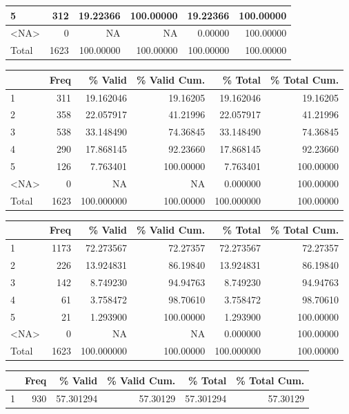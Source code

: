 \documentclass[
  letterpaper,
  DIV=11,
  numbers=noendperiod]{scrartcl}
\begin{document}
\begin{table}
\begin{tabular}[t]{l|r|r|r|r|r}
\hline
5 & 312 & 19.22366 & 100.00000 & 19.22366 & 100.00000\\
\hline
<NA> & 0 & NA & NA & 0.00000 & 100.00000\\
\hline
Total & 1623 & 100.00000 & 100.00000 & 100.00000 & 100.00000\\
\hline
\end{tabular}
\centering
\begin{tabular}[t]{l|r|r|r|r|r}
\hline
  & Freq & \% Valid & \% Valid Cum. & \% Total & \% Total Cum.\\
\hline
1 & 311 & 19.162046 & 19.16205 & 19.162046 & 19.16205\\
\hline
2 & 358 & 22.057917 & 41.21996 & 22.057917 & 41.21996\\
\hline
3 & 538 & 33.148490 & 74.36845 & 33.148490 & 74.36845\\
\hline
4 & 290 & 17.868145 & 92.23660 & 17.868145 & 92.23660\\
\hline
5 & 126 & 7.763401 & 100.00000 & 7.763401 & 100.00000\\
\hline
<NA> & 0 & NA & NA & 0.000000 & 100.00000\\
\hline
Total & 1623 & 100.000000 & 100.00000 & 100.000000 & 100.00000\\
\hline
\end{tabular}
\centering
\begin{tabular}[t]{l|r|r|r|r|r}
\hline
  & Freq & \% Valid & \% Valid Cum. & \% Total & \% Total Cum.\\
\hline
1 & 1173 & 72.273567 & 72.27357 & 72.273567 & 72.27357\\
\hline
2 & 226 & 13.924831 & 86.19840 & 13.924831 & 86.19840\\
\hline
3 & 142 & 8.749230 & 94.94763 & 8.749230 & 94.94763\\
\hline
4 & 61 & 3.758472 & 98.70610 & 3.758472 & 98.70610\\
\hline
5 & 21 & 1.293900 & 100.00000 & 1.293900 & 100.00000\\
\hline
<NA> & 0 & NA & NA & 0.000000 & 100.00000\\
\hline
Total & 1623 & 100.000000 & 100.00000 & 100.000000 & 100.00000\\
\hline
\end{tabular}
\centering
\begin{tabular}[t]{l|r|r|r|r|r}
\hline
  & Freq & \% Valid & \% Valid Cum. & \% Total & \% Total Cum.\\
\hline
1 & 930 & 57.301294 & 57.30129 & 57.301294 & 57.30129\\

\end{tabular}
\end{table}
\end{document}
